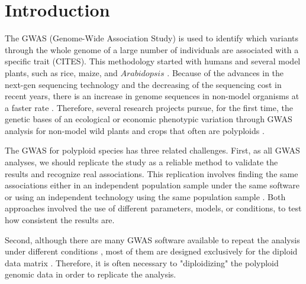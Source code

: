 \documentclass{article}
\begin{document}
\section{Introduction}


The GWAS (Genome-Wide Association Study) is used to identify which variants through the whole genome of a large number of individuals are associated with a specific trait (CITES). This methodology started with humans and several model plants, such as rice, maize, and $Arabidopsis$ \cite{tian2011genome, korte2013advantages}.  Because of the advances in the next-gen sequencing technology and the decreasing of the sequencing cost in recent years, there is an increase in genome sequences in non-model organisms at a faster rate \cite{ekblom2011applications, ellegren2014genome}. Therefore, several research projects pursue, for the first time, the genetic bases of an ecological or economic phenotypic variation through GWAS analysis for non-model wild plants and crops that often are polyploids \cite{ekblom2011applications, santure2018wild}. 

The GWAS for polyploid species has three related challenges. First, as all GWAS analyses, we should replicate the study as a reliable method to validate the results and recognize real associations. This replication involves finding the same associations either in an independent population sample under the same software or using an independent technology using the same population sample \cite{De2014,Pearson2008}. Both approaches involved the use of different parameters, models, or conditions, to test how consistent the results are. 

Second, although there are many GWAS software available to repeat the analysis under different conditions \cite{Gumpinger2018}, most of them are designed exclusively for the diploid data matrix \cite{Bourke2018}. Therefore, it is often necessary to "diploidizing" the polyploid genomic data in order to replicate the analysis. 
\end{document}
